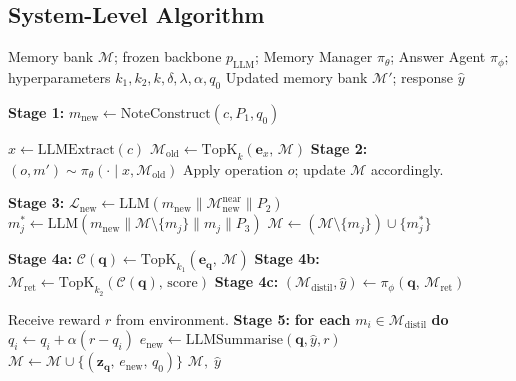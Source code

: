 \documentclass{article}
\newcommand{\memset}{\mathcal{M}}
\newcommand{\note}{m}
\newcommand{\ours}{\textsc{ASEM}\xspace}
\begin{document}
\subsection{System-Level Algorithm}
\label{sec:algorithm}

\begin{algorithm}[t]
\caption{\ours: Agentic Self-Evolving Memory --- Full Pipeline}
\label{alg:asem_overview}
\begin{algorithmic}[1]
  \Require Memory bank $\memset$; frozen backbone $p_{\mathrm{LLM}}$;
           Memory Manager $\pi_\theta$; Answer Agent $\pi_\phi$;
           hyperparameters $k_1, k_2, k, \delta, \lambda, \alpha, q_0$
  \Ensure Updated memory bank $\memset'$; response $\hat{y}$

  \medskip
  \State \textbf{Stage 1:} $\note_{\mathrm{new}} \leftarrow
    \mathrm{NoteConstruct}(c, P_1, q_0)$
    \hfill{}

  \State $x \leftarrow \mathrm{LLMExtract}(c)$
  \State $\memset_{\mathrm{old}} \leftarrow \mathrm{TopK}_k(\mathbf{e}_x,\, \memset)$
  \State \textbf{Stage 2:} $(o, \note') \sim \pi_\theta(\cdot \mid x, \memset_{\mathrm{old}})$
    \hfill{}
  \State Apply operation $o$; update $\memset$ accordingly.

  \State \textbf{Stage 3:} $\mathcal{L}_{\mathrm{new}} \leftarrow
    \mathrm{LLM}(\note_{\mathrm{new}} \| \memset_{\mathrm{new}}^{\mathrm{near}} \| P_2)$
    \hfill{}
  \For{each $\note_j \in \memset_{\mathrm{new}}^{\mathrm{near}}$}
    \State $\note_j^* \leftarrow
      \mathrm{LLM}(\note_{\mathrm{new}} \| \memset \setminus \{\note_j\} \| \note_j \| P_3)$
      \hfill{}
    \State $\memset \leftarrow (\memset \setminus \{\note_j\}) \cup \{\note_j^*\}$
  \EndFor

  \medskip
  \State \textbf{Stage 4a:} $\mathcal{C}(\mathbf{q}) \leftarrow
    \mathrm{TopK}_{k_1}(\mathbf{e}_\mathbf{q},\, \memset)$
    \hfill{}
  \State \textbf{Stage 4b:} $\memset_{\mathrm{ret}} \leftarrow
    \mathrm{TopK}_{k_2}(\mathcal{C}(\mathbf{q}),\, \mathrm{score})$
    \hfill{}
  \State \textbf{Stage 4c:} $(\memset_{\mathrm{distil}}, \hat{y}) \leftarrow
    \pi_\phi(\mathbf{q},\, \memset_{\mathrm{ret}})$
    \hfill{}

  \medskip
  \State Receive reward $r$ from environment.
  \State \textbf{Stage 5:} \textbf{for each} $\note_i \in \memset_{\mathrm{distil}}$
    \textbf{do} $q_i \leftarrow q_i + \alpha(r - q_i)$
    \hfill{}
  \State $e_{\mathrm{new}} \leftarrow \mathrm{LLMSummarise}(\mathbf{q}, \hat{y}, r)$
  \State $\memset \leftarrow \memset \cup \{(\mathbf{z}_\mathbf{q},\, e_{\mathrm{new}},\, q_0)\}$
  \State \Return $\memset,\; \hat{y}$
\end{algorithmic}
\end{algorithm}
\end{document}

